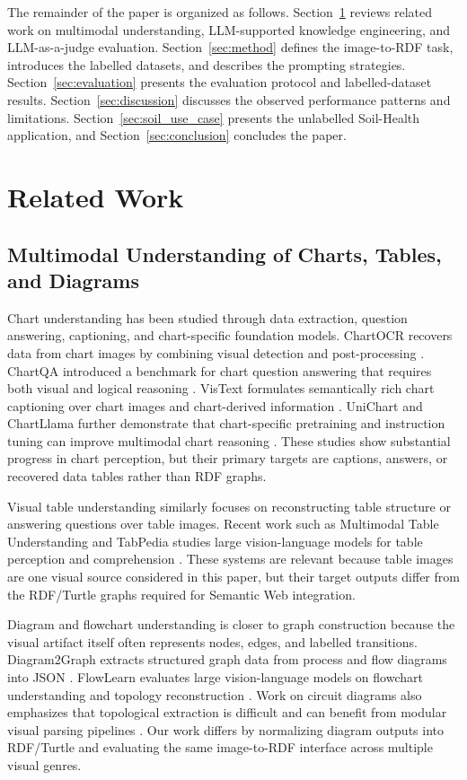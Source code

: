 \documentclass[preprint,12pt]{elsarticle}
\begin{document}
The remainder of the paper is organized as follows. Section~\ref{sec:related} reviews related work on multimodal understanding, LLM-supported knowledge engineering, and LLM-as-a-judge evaluation. Section~\ref{sec:method} defines the image-to-RDF task, introduces the labelled datasets, and describes the prompting strategies. Section~\ref{sec:evaluation} presents the evaluation protocol and labelled-dataset results. Section~\ref{sec:discussion} discusses the observed performance patterns and limitations. Section~\ref{sec:soil_use_case} presents the unlabelled Soil-Health application, and Section~\ref{sec:conclusion} concludes the paper.

\section{Related Work}\label{sec:related}

\subsection{Multimodal Understanding of Charts, Tables, and Diagrams}

Chart understanding has been studied through data extraction, question answering, captioning, and chart-specific foundation models. ChartOCR recovers data from chart images by combining visual detection and post-processing \citep{chartocr}. ChartQA introduced a benchmark for chart question answering that requires both visual and logical reasoning \citep{chartqa}. VisText formulates semantically rich chart captioning over chart images and chart-derived information \citep{vistext}. UniChart and ChartLlama further demonstrate that chart-specific pretraining and instruction tuning can improve multimodal chart reasoning \citep{unichart,chartllama}. These studies show substantial progress in chart perception, but their primary targets are captions, answers, or recovered data tables rather than RDF graphs.

Visual table understanding similarly focuses on reconstructing table structure or answering questions over table images. Recent work such as Multimodal Table Understanding and TabPedia studies large vision-language models for table perception and comprehension \citep{mmtable,tabpedia}. These systems are relevant because table images are one visual source considered in this paper, but their target outputs differ from the RDF/Turtle graphs required for Semantic Web integration.

Diagram and flowchart understanding is closer to graph construction because the visual artifact itself often represents nodes, edges, and labelled transitions. Diagram2Graph extracts structured graph data from process and flow diagrams into JSON \citep{diagram2graph}. FlowLearn evaluates large vision-language models on flowchart understanding and topology reconstruction \citep{flowlearn}. Work on circuit diagrams also emphasizes that topological extraction is difficult and can benefit from modular visual parsing pipelines \citep{circuitdiagram24}. Our work differs by normalizing diagram outputs into RDF/Turtle and evaluating the same image-to-RDF interface across multiple visual genres.
\end{document}
